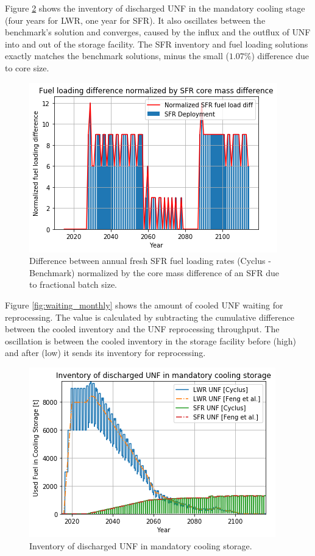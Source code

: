 Figure \ref{fig:fuel_discharge_monthly} shows the inventory of discharged
\gls{UNF} in the mandatory cooling stage (four years for \gls{LWR}, one year for \gls{SFR}).
It also oscillates between the benchmark's
solution and converges, caused by the influx and the outflux of \gls{UNF}
into and out of the storage facility.
The \gls{SFR} inventory and fuel loading
solutions exactly matches the benchmark solutions, minus the small ($1.07\%$) difference due to core
size.

\begin{figure}[htbp!]
	\begin{center}
		\includegraphics[scale=0.5]{./images/results_18/fuel_load_diff_norm.png}
	\end{center}
	\caption{Difference between annual fresh \gls{SFR} fuel loading rates (Cyclus - Benchmark) normalized by the core mass difference of an \gls{SFR} due to fractional batch size.}
	\label{fig:fuel_load_diff_norm}
\end{figure}


Figure \ref{fig:waiting_monthly} shows the amount of cooled \gls{UNF} waiting for
reprocessing. The value is calculated by subtracting the cumulative difference between
the cooled inventory and the \gls{UNF} reprocessing throughput.
The oscillation is between the cooled inventory in the storage facility before (high)
and after (low) it sends its inventory for reprocessing.

\begin{figure}[htbp!]
	\begin{center}
		\includegraphics[scale=0.5]{./images/results_18/fuel_discharge_monthly.png}
	\end{center}
	\caption{Inventory of discharged \gls{UNF} in mandatory cooling storage.}
	\label{fig:fuel_discharge_monthly}
\end{figure}


